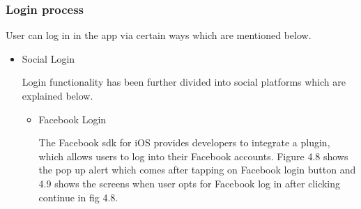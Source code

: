 \subsubsection{Login process}

User can log in in the app via certain ways which are mentioned below.

\begin{itemize}
    \item Social Login
    
    Login functionality has been further divided into social platforms which are explained below.
    
    \begin{itemize}
        \item Facebook Login
        
       The Facebook \gls{sdk} for \gls{iOS} provides developers to integrate a plugin, which allows users to log into their Facebook accounts. Figure 4.8 shows the pop up alert which comes after tapping on Facebook login button and 4.9 shows the screens when user opts for Facebook log in after clicking continue in fig 4.8.
       

\end{itemize}
\end{itemize}
